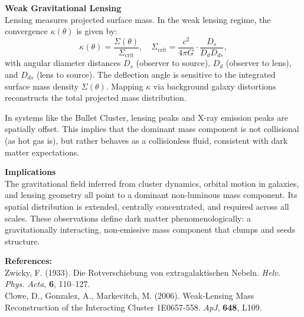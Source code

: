 \begin{technical}
\noindent\textbf{Weak Gravitational Lensing}\\[0.5em]
Lensing measures projected surface mass. In the weak lensing regime, the convergence \( \kappa(\theta) \) is given by:
\[
\kappa(\theta) = \frac{\Sigma(\theta)}{\Sigma_{\text{crit}}}, \quad
\Sigma_{\text{crit}} = \frac{c^2}{4\pi G} \cdot \frac{D_s}{D_d D_{ds}},
\]
with angular diameter distances \( D_s \) (observer to source), \( D_d \) (observer to lens), and \( D_{ds} \) (lens to source). The deflection angle is sensitive to the integrated surface mass density \( \Sigma(\theta) \). Mapping \( \kappa \) via background galaxy distortions reconstructs the total projected mass distribution.

In systems like the Bullet Cluster, lensing peaks and X-ray emission peaks are spatially offset. This implies that the dominant mass component is not collisional (as hot gas is), but rather behaves as a collisionless fluid, consistent with dark matter expectations.

\noindent\textbf{Implications}\\[0.5em]
The gravitational field inferred from cluster dynamics, orbital motion in galaxies, and lensing geometry all point to a dominant non-luminous mass component. Its spatial distribution is extended, centrally concentrated, and required across all scales. These observations define dark matter phenomenologically: a gravitationally interacting, non-emissive mass component that clumps and seeds structure.

\vspace{0.5em}
\noindent\textbf{References:}\\
Zwicky, F. (1933). Die Rotverschiebung von extragalaktischen Nebeln. \textit{Helv. Phys. Acta}, \textbf{6}, 110--127.\\
Clowe, D., Gonzalez, A., Markevitch, M. (2006). Weak-Lensing Mass Reconstruction of the Interacting Cluster 1E0657-558. \textit{ApJ}, \textbf{648}, L109.
\end{technical}
